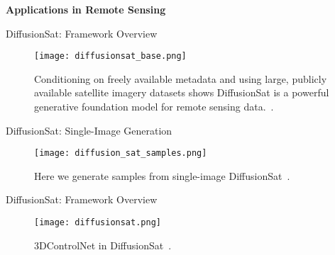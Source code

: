 


\begin{refsection}
  \begin{frame}
    \centering
    \vspace{2.5cm}
    {\LARGE \textbf{Applications in Remote Sensing}}
  \end{frame}
\end{refsection}




\begin{refsection}
  \begin{frame}{DiffusionSat: Framework Overview}
    \begin{figure}
      \centering
      \texttt{[image: diffusionsat\_base.png]}
      \caption[]{\scriptsize Conditioning on freely available metadata and using large, publicly available satellite imagery datasets shows DiffusionSat is a powerful generative foundation model for remote sensing data.~\parencite{diffusionset2024}.}
    \end{figure}
    \bottomleftrefs
  \end{frame}
  \end{refsection}
  
  \begin{refsection}
    \begin{frame}{DiffusionSat: Single-Image Generation}
      \begin{figure}
        \centering
        \texttt{[image: diffusion\_sat\_samples.png]}
        \caption[]{\scriptsize Here we generate samples from single-image DiffusionSat~\parencite{diffusionset2024}.}
      \end{figure}
      \bottomleftrefs
    \end{frame}
  \end{refsection}

  \begin{refsection}
    \begin{frame}{DiffusionSat: Framework Overview}
      \begin{figure}
        \centering
        \texttt{[image: diffusionsat.png]}
        \caption[]{\scriptsize 3DControlNet in DiffusionSat~\parencite{diffusionset2024}.}
      \end{figure}
      \bottomleftrefs
    \end{frame}
    \end{refsection}

